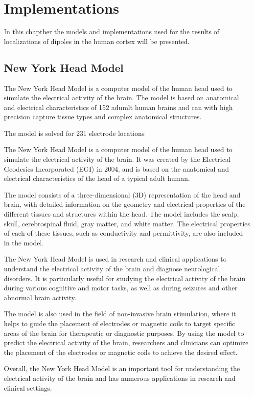 \documentclass[a4paper, UKenglish, 11pt]{uiomaster}
\begin{document}
\chapter{Implementations}
In this chapther the models and implementations used for the results of localizations of dipoles in the human cortex will be presented.

\section{New York Head Model}
The New York Head Model is a computer model of the human head used to simulate the electrical activity of the brain. The model is based on anatomical and electrical characteristics of 152 adumlt human brains and can with high precision capture tissue types and complex anatomical structures.

The model is solved for 231 electrode locations 

The New York Head Model is a computer model of the human head used to simulate the electrical activity of the brain. It was created by the Electrical Geodesics Incorporated (EGI) in 2004, and is based on the anatomical and electrical characteristics of the head of a typical adult human.

The model consists of a three-dimensional (3D) representation of the head and brain, with detailed information on the geometry and electrical properties of the different tissues and structures within the head. The model includes the scalp, skull, cerebrospinal fluid, gray matter, and white matter. The electrical properties of each of these tissues, such as conductivity and permittivity, are also included in the model.

The New York Head Model is used in research and clinical applications to understand the electrical activity of the brain and diagnose neurological disorders. It is particularly useful for studying the electrical activity of the brain during various cognitive and motor tasks, as well as during seizures and other abnormal brain activity.

The model is also used in the field of non-invasive brain stimulation, where it helps to guide the placement of electrodes or magnetic coils to target specific areas of the brain for therapeutic or diagnostic purposes. By using the model to predict the electrical activity of the brain, researchers and clinicians can optimize the placement of the electrodes or magnetic coils to achieve the desired effect.

Overall, the New York Head Model is an important tool for understanding the electrical activity of the brain and has numerous applications in research and clinical settings.
\end{document}
